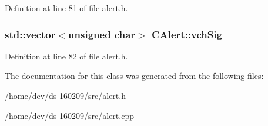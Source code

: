 Definition at line 81 of file alert.\+h.

\hypertarget{class_c_alert_a541b49670ebf387a5f8b7de59277fed0}{}
\subsubsection[{vch\+Sig}]{\setlength{\rightskip}{0pt plus 5cm}std\+::vector$<$unsigned char$>$ C\+Alert\+::vch\+Sig}\label{class_c_alert_a541b49670ebf387a5f8b7de59277fed0}


Definition at line 82 of file alert.\+h.



The documentation for this class was generated from the following files\+:\begin{DoxyCompactItemize}
\item 
/home/dev/ds-\/160209/src/\hyperlink{alert_8h}{alert.\+h}\item 
/home/dev/ds-\/160209/src/\hyperlink{alert_8cpp}{alert.\+cpp}\end{DoxyCompactItemize}
